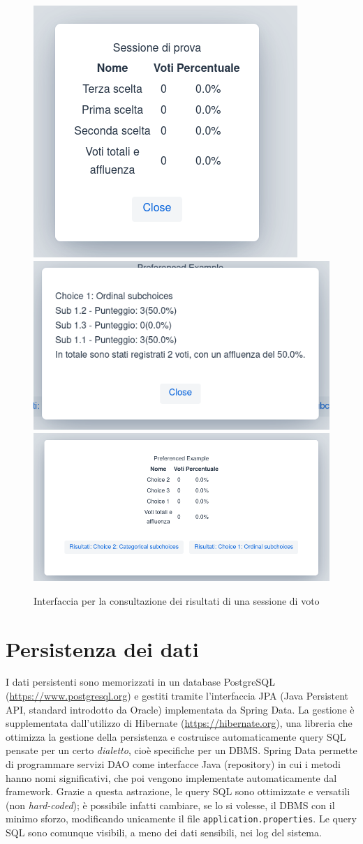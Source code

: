 \begin{figure}
	\centering
	\includegraphics[height=0.3\textwidth]{img/gui/consultResult.png}
	\includegraphics[height=0.3\textwidth]{img/gui/consultResultOrdinal.png}
	\includegraphics[height=0.4\textwidth]{img/gui/consultResultPreferenced.png}
	\caption{Interfaccia per la consultazione dei risultati di una sessione di voto}
	\label{screenshot:consultresult}
\end{figure}


\section{Persistenza dei dati}\label{db}
I dati persistenti sono memorizzati in un database PostgreSQL (\url{https://www.postgresql.org}) e gestiti tramite l'interfaccia JPA (Java Persistent API, standard introdotto da Oracle) implementata da Spring Data. La gestione è supplementata dall'utilizzo di Hibernate (\url{https://hibernate.org}), una libreria che ottimizza la gestione della persistenza e costruisce automaticamente query SQL pensate per un certo \emph{dialetto}, cioè specifiche per un DBMS. Spring Data permette di programmare servizi DAO come interfacce Java (repository) in cui i metodi hanno nomi significativi, che poi vengono implementate automaticamente dal framework. Grazie a questa astrazione, le query SQL sono ottimizzate e versatili (non \emph{hard-coded}); è possibile infatti cambiare, se lo si volesse, il DBMS con il minimo sforzo, modificando unicamente il file \verb!application.properties!. Le query SQL sono comunque visibili, a meno dei dati sensibili, nei log del sistema.




